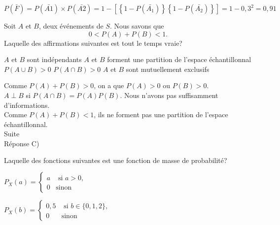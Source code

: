 \begin{questions}
\vspace{1cm}

\begin{solution}
$P(\bar{F})= P(\bar{A1}) \times P(\bar{A2}) = 1 - \left[\left\{1-P\left(\bar{A_1}\right)\right\}\left\{1-P\left(\bar{A_2}\right)\right\}\right]=1-0,3^2=0,91$
\end{solution}

\question[3] Soit $A$ et $B$, deux événements de $S$. Nous savons que $$0<P(A)+P(B)<1.$$ Laquelle des affirmations suivantes est tout le temps vraie?

\begin{checkboxes}
    \choice $A$ et $B$ sont indépendants
    \choice $A$ et $B$ forment une partition de l'espace échantillonnal
    \correctchoice $P(A \cup B) > 0$
    \choice $P(A \cap B) > 0$
    \choice $A$ et $B$ sont mutuellement exclusifs
\end{checkboxes}

\begin{solution}
Comme $P(A)+P(B)>0$, on a que $P(A)>0$ ou $P(B)>0$.\\ 
$A \perp B$ si $P(A\cap B)=P(A)P(B)$. Nous n'avons pas suffisamment d'informations.\\
Comme $P(A)+P(B)<1$, ils ne forment pas une partition de l'espace échantillonnal.\\
Suite\\
Réponse C)
\end{solution}

\vspace{1cm}



\question[3] Laquelle des fonctions suivantes est une fonction de masse de probabilité? %

\begin{checkboxes}
\choice $P_X(a)=\left\{
\begin{array}{ll}
a  & \mbox{ si } a>0, \\
0 & \mbox{sinon}
\end{array}
\right.$

\vspace{0.3cm}

\choice $ \displaystyle P_X(b)= \left\{
\begin{array}{ll}
0,5 &\mbox{ si } b \in \{0,1,2\}, \\
0 & \mbox{sinon}
\end{array}
\right.$

\vspace{0.3cm}


\end{checkboxes}
\end{questions}
